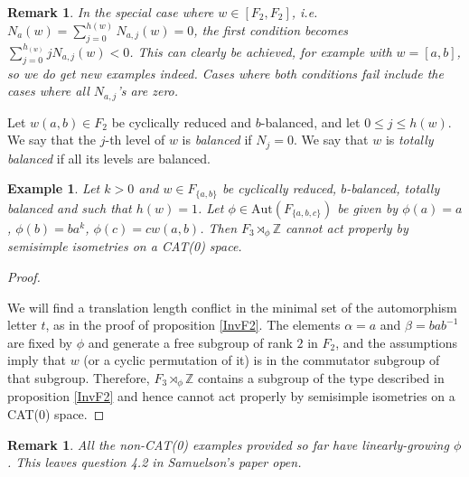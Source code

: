 \documentclass  [a4paper, 11pts] {article}
\newtheorem{exm}[thm]{Example}
\newtheorem{req}[thm]{Remark}
\newcommand{\Z}{\mathbb{Z}}
\newcommand{\Aut}{{\mathrm{Aut}}}
\begin{document}
\begin{req}
    In the special case where $w\in [F_2, F_2]$, i.e. $N_a(w) = \sum_{j=0}^{h(w)} N_{a,j}(w) = 0$, the first condition becomes $\sum_{j=0}^{h_(w)}jN_{a,j}(w) < 0$. This can clearly be achieved, for example with $w = [a, b]$, so we do get new examples indeed. Cases where both conditions fail include the cases where all $N_{a,j}$'s are zero.
\end{req}

Let $w(a, b)\in F_2$ be cyclically reduced and $b$-balanced, and let $0\le j\le h(w)$. We say that the $j$-th level of $w$ is \emph{balanced} if $N_j = 0$. We say that $w$ is \emph{totally balanced} if all its levels are balanced.

\begin{exm}
\label{nonCAT0ex}
    Let $k > 0$ and $w\in F_{\{a, b\}}$ be cyclically reduced, $b$-balanced, totally balanced and such that $h(w)=1$. Let $\phi\in \Aut(F_{\{a, b, c\}})$ be given by $\phi(a)=a$, $\phi(b)=ba^k$, $\phi(c) = cw(a,b)$. Then $F_3\rtimes_\phi\Z$ cannot act properly by semisimple isometries on a CAT(0) space.
\end{exm}

\begin{proof} ~

We will find a translation length conflict in the minimal set of the automorphism letter $t$, as in the proof of proposition \ref{InvF2}. The elements $\alpha = a$ and $\beta = bab^{-1}$ are fixed by $\phi$ and generate a free subgroup of rank $2$ in $F_2$, and the assumptions imply that $w$ (or a cyclic permutation of it) is in the commutator subgroup of that subgroup. Therefore, $F_3\rtimes_\phi\Z$ contains a subgroup of the type described in proposition \ref{InvF2} and hence cannot act properly by semisimple isometries on a CAT(0) space.

\end{proof}

\begin{req}
    All the non-CAT(0) examples provided so far have linearly-growing $\phi$. This leaves question 4.2 in Samuelson's paper open.
\end{req}

\printbibliography
\end{document}
